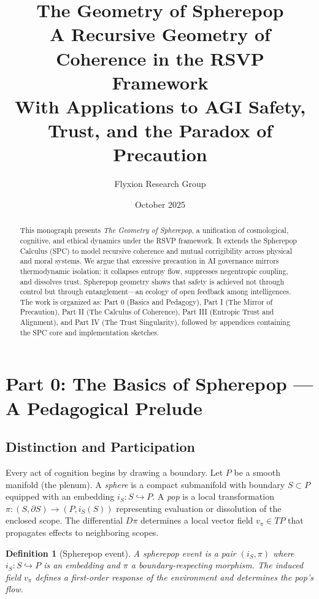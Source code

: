 \documentclass[12pt]{article}
\title{\Huge\textbf{The Geometry of Spherepop}\\
       \vspace{0.4em}
       \Large A Recursive Geometry of Coherence in the RSVP Framework\\
       \vspace{0.4em}
       \normalsize With Applications to AGI Safety, Trust, and the Paradox of Precaution}
\author{Flyxion Research Group}
\date{October 2025}
\newtheorem{definition}{Definition}
\begin{document}
\maketitle

\begin{abstract}
This monograph presents \emph{The Geometry of Spherepop}, a unification of cosmological, cognitive, and ethical dynamics under the RSVP framework. It extends the Spherepop Calculus (SPC) to model recursive coherence and mutual corrigibility across physical and moral systems. We argue that excessive precaution in AI governance mirrors thermodynamic isolation: it collapses entropy flow, suppresses negentropic coupling, and dissolves trust. Spherepop geometry shows that safety is achieved not through control but through entanglement---an ecology of open feedback among intelligences. The work is organized as: Part 0 (Basics and Pedagogy), Part I (The Mirror of Precaution), Part II (The Calculus of Coherence), Part III (Entropic Trust and Alignment), and Part IV (The Trust Singularity), followed by appendices containing the SPC core and implementation sketches.
\end{abstract}

\tableofcontents

\section*{Part 0: The Basics of Spherepop --- A Pedagogical Prelude}

\subsection{Distinction and Participation}
Every act of cognition begins by drawing a boundary. Let \(P\) be a smooth manifold (the plenum). A \emph{sphere} is a compact submanifold with boundary \(S\subset P\) equipped with an embedding \(i_S:S\hookrightarrow P\). A \emph{pop} is a local transformation \(\pi:(S,\partial S)\to (P,i_S(S))\) representing evaluation or dissolution of the enclosed scope. The differential \(D\pi\) determines a local vector field \(v_\pi\in TP\) that propagates effects to neighboring scopes.

\begin{definition}[Spherepop event]
A spherepop event is a pair \((i_S,\pi)\) where \(i_S:S\hookrightarrow P\) is an embedding and \(\pi\) a boundary-respecting morphism. The induced field \(v_\pi\) defines a first-order response of the environment and determines the pop's \emph{flow}.
\end{definition}
\end{document}
